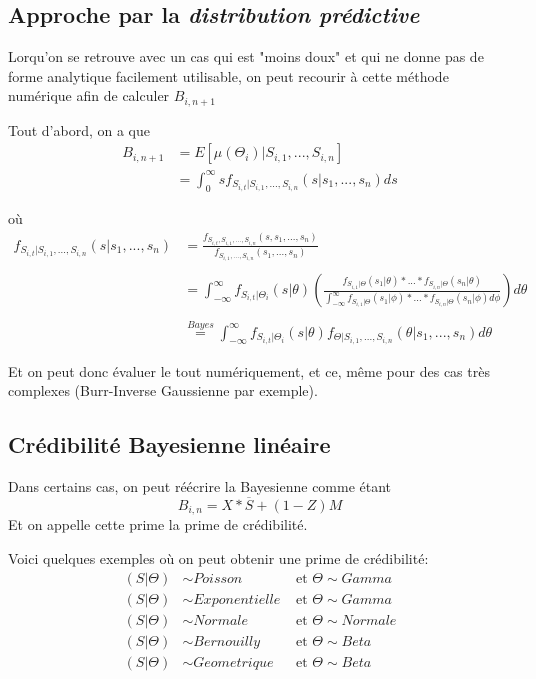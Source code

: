 \subsection{ Approche par la \textit{distribution prédictive}}

Lorqu'on se retrouve avec un cas qui est "moins doux" et qui ne donne pas de forme analytique facilement utilisable, on peut recourir à cette méthode numérique afin de calculer $B_{i,n+1}$

Tout d'abord, on a que 
$$\begin{aligned} B_{i,n+1} &= E[\mu(\Theta_i)|S_{i,1},...,S_{i,n}] \\
&= \int_0^{\infty} s f_{S_{i,t}|S_{i,1},...,S_{i,n}}(s|s_1,...,s_n) ds \end{aligned}$$

où
$$\begin{aligned} 
f_{S_{i,t}|S_{i,1},...,S_{i,n}}(s|s_1,...,s_n) &= \frac{f_{S_{i,t},S_{i,1},...,S_{i,n}}(s,s_1,...,s_n)}{f_{S_{i,1},...,S_{i,n}}(s_1,...,s_n)} \\ \\
&= \int_{-\infty}^{\infty} f_{S_{i,t}|\Theta_i}(s|\theta) \left(\frac{f_{S_{i,1}|\Theta}(s_1|\theta)*...*f_{S_{i,n}|\Theta}(s_n|\theta)}{\int_{-\infty}^{\infty} f_{S_{i,1}|\Theta}(s_1|\phi)*...*f_{S_{i,n}|\Theta}(s_n|\phi) d\phi} \right) d\theta \\ \\
&\overset{Bayes}{=} \int_{-\infty}^{\infty} f_{S_{i,t}|\Theta_i}(s|\theta) f_{\Theta|S_{i,1},...,S_{i,n}}(\theta|s_1,...,s_n) d\theta 
\end{aligned}$$

Et on peut donc évaluer le tout numériquement, et ce, même pour des cas très complexes (Burr-Inverse Gaussienne par exemple).

\subsection{Crédibilité Bayesienne linéaire}

Dans certains cas, on peut réécrire la Bayesienne comme étant
$$B_{i,n}=X* \overline{S} + (1-Z)M$$
Et on appelle cette prime la prime de crédibilité.

Voici quelques exemples où on peut obtenir une prime de crédibilité:
$$\begin{aligned}
(S|\Theta) &\sim Poisson &\text{ et } \Theta \sim Gamma \\
(S|\Theta) &\sim Exponentielle &\text{ et } \Theta \sim Gamma \\
(S|\Theta) &\sim Normale &\text{ et } \Theta \sim Normale \\
(S|\Theta) &\sim Bernouilly &\text{ et } \Theta \sim Beta \\
(S|\Theta) &\sim Geometrique &\text{ et } \Theta \sim Beta
\end{aligned}$$


